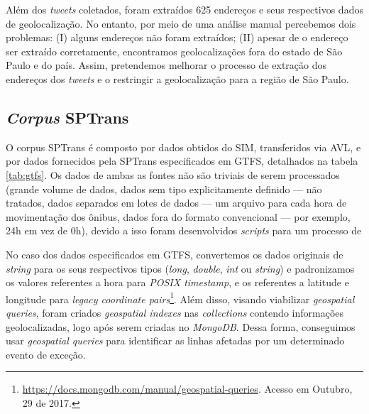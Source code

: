 \documentclass[
	12pt,				%
	oneside,			%
	a4paper,			%
	english,			%
	brazil				%
	]{abntex2ppgsi}
\begin{document}
Além dos \textit{tweets} coletados, foram extraídos 625 endereços e seus respectivos dados de geolocalização. No entanto, por meio de uma análise manual percebemos dois problemas: (I) alguns endereços não foram extraídos; (II) apesar de o endereço ser extraído corretamente, encontramos geolocalizações fora do estado de São Paulo e do país. Assim, pretendemos melhorar o processo de extração dos endereços dos \textit{tweets} e o restringir a geolocalização para a região de São Paulo. 

\subsection{\textit{Corpus} SPTrans}
\label{CorpusSPTrans}

O corpus SPTrans é composto por dados obtidos do SIM, transferidos via AVL, e por dados fornecidos pela SPTrans especificados em GTFS, detalhados na tabela \ref{tab:gtfs}. Os dados de ambas as fontes não são triviais de serem processados (grande volume de dados, dados sem tipo explicitamente definido --- não tratados, dados separados em lotes de dados --- um arquivo para cada hora de movimentação dos ônibus, dados fora do formato convencional --- por exemplo, 24h em vez de 0h), devido a isso foram desenvolvidos \textit{scripts} para um processo de  

No caso dos dados especificados em GTFS, convertemos os dados originais de \textit{string} para os seus respectivos tipos (\textit{long}, \textit{double}, \textit{int} ou \textit{string}) e padronizamos os valores referentes a hora para \textit{POSIX timestamp}, e os referentes a latitude e longitude para  \textit{legacy coordinate pairs}\footnote{\label{geoMongo}\url{https://docs.mongodb.com/manual/geospatial-queries}. Acesso em Outubro, 29 de 2017.}. Além disso, visando viabilizar \textit{geospatial queries}, foram criados \textit{geospatial indexes} nas \textit{collections} contendo informações geolocalizadas, logo após serem criadas no \textit{MongoDB}. Dessa forma, conseguimos usar \textit{geospatial queries} para identificar as linhas afetadas por um determinado evento de exceção.
\end{document}
